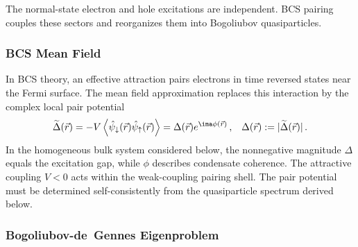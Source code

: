             The normal-state electron and hole excitations are independent. BCS pairing couples these sectors and reorganizes them into Bogoliubov quasiparticles.

        \subsubsection*{BCS Mean Field}
        \label{subsubsec:micro:bcs-mean-field}

            In BCS theory, an effective attraction pairs electrons in time reversed states near the Fermi surface. The mean field approximation replaces this interaction by the complex local pair potential
            \begin{align}
                \widetilde{\Delta}(\vec r)
                =-V\left\langle
                \hat\psi_\downarrow(\vec r)
                \hat\psi_\uparrow(\vec r)
                \right\rangle
                =\Delta(\vec r)e^{\ima\phi(\vec r)}\,,
                &&
                \Delta(\vec r):=|\widetilde{\Delta}(\vec r)|\,.
                \label{eq:micro:complex-delta}
            \end{align}
            In the homogeneous bulk system considered below, the nonnegative magnitude $\Delta$ equals the excitation gap, while $\phi$ describes condensate coherence. The attractive coupling $V<0$ acts within the weak-coupling pairing shell. The pair potential must be determined self-consistently from the quasiparticle spectrum derived below. \cite{bardeen_theory_1957}

        \subsubsection*{Bogoliubov-de~Gennes Eigenproblem}
        \label{subsubsec:micro:bdg-eigenproblem}

